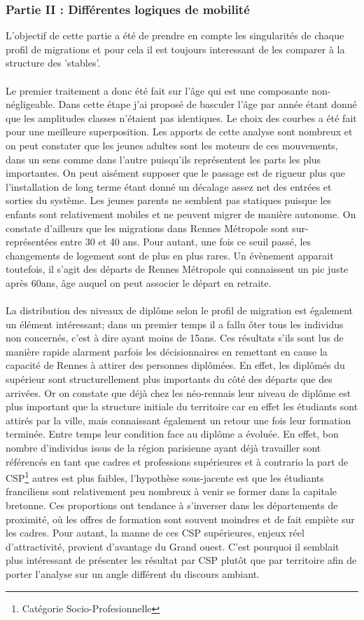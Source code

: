 \documentclass{bredele}
\begin{document}
\subsubsection{Partie II : Différentes logiques de mobilité}
L'objectif de cette partie a été de prendre en compte les singularités de chaque profil de migrations et pour cela il est toujours interessant de les comparer à la structure des 'stables'.
\\\\Le premier traitement a donc été fait sur l'âge qui est une composante non-négligeable. Dans cette étape j'ai proposé de basculer l'âge par année étant donné que les amplitudes classes n'étaient pas identiques. Le choix des courbes a été fait pour une meilleure superposition. Les apports de cette analyse sont nombreux et on peut constater que les jeunes adultes sont les moteurs de ces mouvements, dans un sens comme dans l'autre puisqu'ils représentent les parts les plus importantes. On peut aisément supposer que le passage est de rigueur plus que l'installation de long terme étant donné un décalage assez net des entrées et sorties du système. Les jeunes parents ne semblent pas statiques puisque les enfants sont relativement mobiles et ne peuvent migrer de manière autonome. On constate d'ailleurs que les migrations dans Rennes Métropole sont sur-représentées entre 30 et 40 ans. Pour autant, une fois ce seuil passé, les changements de logement sont de plus en plus rares. Un évènement apparait toutefois, il s'agit des départs de Rennes Métropole qui connaissent un pic juste après 60ans, âge auquel on peut associer le départ en retraite.
\\\\La distribution des niveaux de diplôme selon le profil de migration est également un élément intéressant; dans un premier temps il a fallu ôter tous les individus non concernés, c'est à dire ayant moins de 15ans. Ces résultats s'ils sont lus de manière rapide alarment parfois les décisionnaires en remettant en cause la capacité de Rennes à attirer des personnes diplômées. En effet, les diplômés du supérieur sont structurellement plus importants du côté des départs que des arrivées. Or on constate que déjà chez les néo-rennais leur niveau de diplôme est plus important que la structure initiale du territoire car en effet les étudiants sont attirés par la ville, mais connaissant également un retour une fois leur formation terminée. Entre temps leur condition face au diplôme a évoluée.
En effet, bon nombre d’individus issus de la région parisienne ayant déjà travailler sont référencés en tant que cadres et professions supérieures et à contrario la part de CSP\footnote{Catégorie Socio-Profesionnelle} autres est plus faibles, l’hypothèse sous-jacente est que les étudiants franciliens sont relativement peu nombreux à venir se former dans la capitale bretonne. Ces proportions ont tendance à s’inverser dans les départements de proximité, où les offres de formation sont souvent moindres et de fait empiète sur les cadres. Pour autant, la manne de ces CSP supérieures, enjeux réel d’attractivité, provient d’avantage du Grand ouest. C’est pourquoi il semblait plus intéressant de présenter les résultat par CSP plutôt que par territoire afin de porter l’analyse sur un angle différent du discours ambiant.
\end{document}
